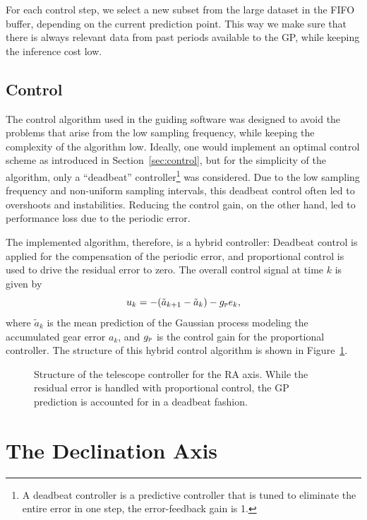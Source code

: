 For each control step, we select a new subset from the large dataset in the FIFO
buffer, depending on the current prediction point. This way we make sure that
there is always relevant data from past periods available to the GP, while
keeping the inference cost low.

\subsection{Control}

The control algorithm used in the guiding software was designed to avoid the
problems that arise from the low sampling frequency, while keeping the
complexity of the algorithm low. Ideally, one would implement an optimal
control scheme as introduced in Section~\ref{sec:control}, but for the
simplicity of the algorithm, only a ``deadbeat'' controller\footnote{A deadbeat
controller is a predictive controller that is tuned to eliminate the entire
error in one step, \ie the error-feedback gain is 1.} was considered. Due to
the low sampling frequency and non-uniform sampling intervals, this deadbeat
control often led to overshoots and instabilities. Reducing the control gain, on
the other hand, led to performance loss due to the periodic error.

The implemented algorithm, therefore, is a hybrid controller: Deadbeat control
is applied for the compensation of the periodic error, and proportional control
is used to drive the residual error to zero. The overall control signal at time
$k$ is given by
\begin{equation}
  \label{eq:dead-P}
  u_k = -(\tilde a_{k+1} - \tilde a_{k}) - g_\mathsc{p} e_k,
\end{equation}
where $\tilde a_{k}$ is the mean prediction of the Gaussian process
modeling the accumulated gear error $a_k$, and $g_{\normalfont\textsc{p}}$ is the control
gain for the proportional controller. The structure of this
hybrid control algorithm is shown in Figure~\ref{fig:PEC_controller}.

\begin{figure}%
  \center%
  \caption[Structure of the telescope controller for the RA axis.]{
Structure of the telescope controller for the RA axis. While the residual error
is handled with proportional control, the GP prediction is accounted for in a
deadbeat fashion.}
  \label{fig:PEC_controller}
\end{figure}

\section{The Declination Axis}
\label{sec:the-dec-axis}

